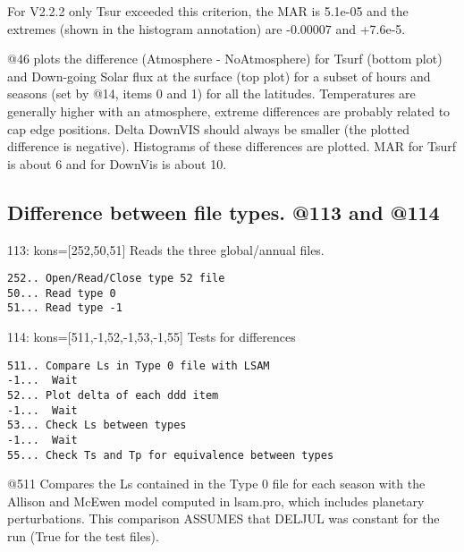 \documentclass{article}  %
\begin{document}
For V2.2.2 only Tsur exceeded this criterion, the MAR is 5.1e-05 and the
extremes (shown in the histogram annotation) are -0.00007 and +7.6e-5.

@46 plots the difference (Atmosphere - NoAtmosphere) for Tsurf (bottom plot) and
Down-going Solar flux at the surface (top plot) for a subset of hours and
seasons (set by @14, items 0 and 1) for all the latitudes. Temperatures are
generally higher with an atmosphere, extreme differences are probably related to
cap edge positions. Delta DownVIS should always be smaller (the plotted
difference is negative).  Histograms of these differences are plotted.  MAR for
Tsurf is about 6 and for DownVis is about 10.

\subsection{Difference between file types. @113 and @114 } %
 
113: kons=[252,50,51] Reads the three global/annual files. 
\vspace{-3.mm} 
\begin{verbatim}
252.. Open/Read/Close type 52 file
50... Read type 0
51... Read type -1
\end{verbatim}

114: kons=[511,-1,52,-1,53,-1,55] Tests for differences 
\vspace{-3.mm} 
\begin{verbatim}
511.. Compare Ls in Type 0 file with LSAM 
-1...  Wait
52... Plot delta of each ddd item
-1...  Wait
53... Check Ls between types
-1...  Wait
55... Check Ts and Tp for equivalence between types
\end{verbatim}

@511 Compares the Ls contained in the Type 0 file for each season with the
Allison and McEwen model computed in lsam.pro, which includes planetary
perturbations. This comparison ASSUMES that DELJUL was constant for the run
(True for the test files).
\end{document}
